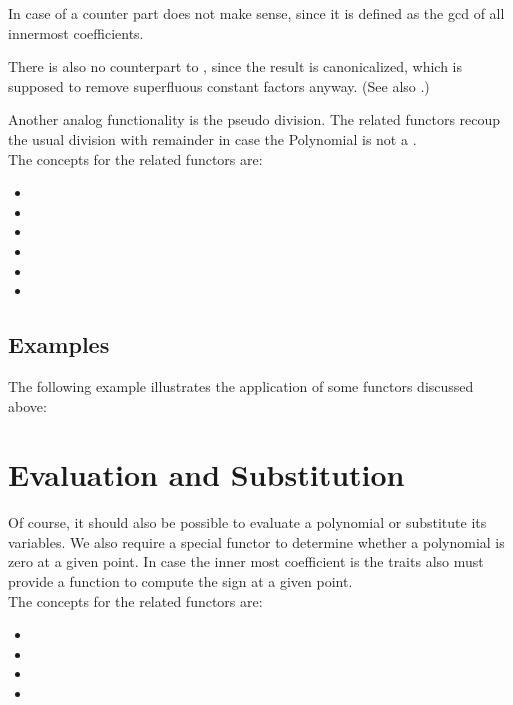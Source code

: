In case of  a counter part does 
not make sense, since it is defined as the gcd of all innermost coefficients. 

There is also no counterpart to , since 
the result is canonicalized, which is supposed to remove superfluous constant 
factors anyway. (See also .)


Another analog functionality is the pseudo division. 
The related functors recoup the usual division with remainder in case the 
Polynomial is not a . \\
The concepts for the related functors are: 
\begin{itemize}
\item {}
\item {}
\item {}
\item {}
\item {}
\item {}
\end{itemize}


\subsection{Examples}
The following example illustrates the application of some functors 
discussed above:

\section{Evaluation and Substitution}

Of course, it should also be possible to evaluate a polynomial 
or substitute its variables. We also require a special functor to 
determine whether a polynomial is zero at a given point. 
In case the inner most coefficient is  the traits 
also must provide a function to compute the sign at a given point. \\
The concepts for the related functors are:
\begin{itemize}
\item {}
\item {}
\item {}
\item {}
\end{itemize}


